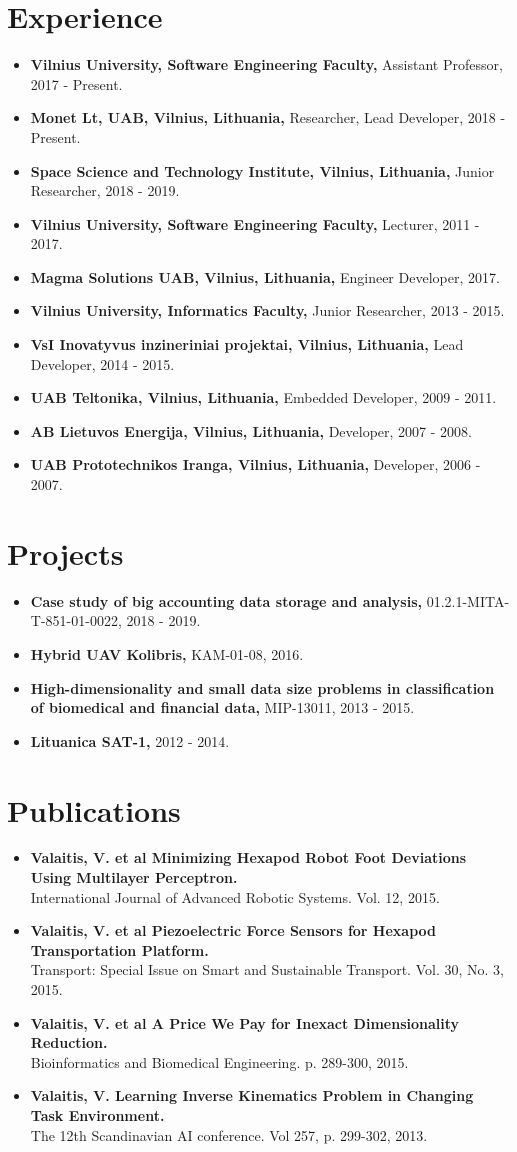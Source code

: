 \documentclass[a4paper,11pt]{article}
\newcommand{\resumeItem}[2]{
  \item\small{
    \textbf{#1}{ #2 \vspace{-2pt}}
  }
}
\newcommand{\resumeSubItem}[2]{\resumeItem{#1}{#2}\vspace{-4pt}}
\newcommand{\resumeSubHeadingListStart}{\begin{itemize}[leftmargin=*] \renewcommand\labelitemi{$\circ$}}
\newcommand{\resumeSubHeadingListEnd}{\end{itemize}}
\begin{document}
\section{Experience}
  \resumeSubHeadingListStart
    \resumeSubItem{Vilnius University, Software Engineering Faculty,}{Assistant Professor, 2017 - Present.}
    \resumeSubItem{Monet Lt, UAB, Vilnius, Lithuania,}{Researcher, Lead Developer, 2018 - Present.}
    \resumeSubItem{Space Science and Technology Institute, Vilnius, Lithuania,}{Junior Researcher, 2018 - 2019.}
    \resumeSubItem{Vilnius University, Software Engineering Faculty,}{Lecturer, 2011 - 2017.}
    \resumeSubItem{Magma Solutions UAB, Vilnius, Lithuania,}{Engineer Developer, 2017.}
    \resumeSubItem{Vilnius University, Informatics Faculty,}{Junior Researcher, 2013 - 2015.}
    \resumeSubItem{VsI Inovatyvus inzineriniai projektai, Vilnius, Lithuania,}{Lead Developer, 2014 - 2015.}
    \resumeSubItem{UAB Teltonika, Vilnius, Lithuania,}{Embedded Developer, 2009 - 2011.}
    \resumeSubItem{AB Lietuvos Energija, Vilnius, Lithuania,}{Developer, 2007 - 2008.}
    \resumeSubItem{UAB Prototechnikos Iranga, Vilnius, Lithuania,}{Developer, 2006 - 2007.}
  \resumeSubHeadingListEnd
\vspace{-15pt}
\section{Projects}
  \resumeSubHeadingListStart
    \resumeSubItem{Case study of big accounting data storage and analysis,}{01.2.1-MITA-T-851-01-0022, 2018 - 2019.}
    \resumeSubItem{Hybrid UAV Kolibris,}{KAM-01-08, 2016.}
    \resumeSubItem{High-dimensionality and small data size problems in classification of biomedical and financial data,}{MIP-13011, 2013 - 2015.}
    \resumeSubItem{Lituanica SAT-1,}{2012 - 2014.}
  \resumeSubHeadingListEnd
\vspace{-15pt}
\section{Publications}
    \resumeSubHeadingListStart
    \resumeSubItem{Valaitis, V. et al Minimizing Hexapod Robot Foot Deviations Using Multilayer Perceptron.\\}{International Journal of Advanced Robotic Systems. Vol. 12, 2015.}
    \resumeSubItem{Valaitis, V. et al Piezoelectric Force Sensors for Hexapod Transportation Platform.\\}{Transport: Special Issue on Smart and Sustainable Transport. Vol. 30, No. 3, 2015.}
    \resumeSubItem{Valaitis, V. et al A Price We Pay for Inexact Dimensionality Reduction.\\}{Bioinformatics and Biomedical Engineering. p. 289-300, 2015.}
    \resumeSubItem{Valaitis, V. Learning Inverse Kinematics Problem in Changing Task Environment.\\}{The 12th Scandinavian AI conference. Vol 257, p. 299-302, 2013.}
  \resumeSubHeadingListEnd
\vspace{-15pt}
\end{document}
